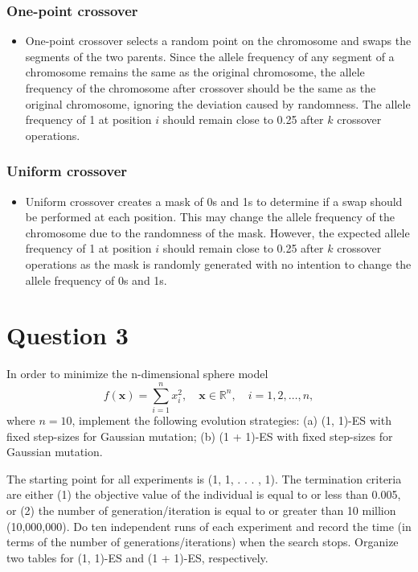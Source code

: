 \documentclass[12pt,letterpaper]{article}
\begin{document}
\subsubsection*{One-point crossover}
\begin{itemize}
    \item One-point crossover selects a random point on the chromosome and swaps the segments of the two parents. Since the allele frequency of any segment of a chromosome remains the same as the original chromosome, the allele frequency of the chromosome after crossover should be the same as the original chromosome, ignoring the deviation caused by randomness. The allele frequency of 1 at position $i$ should remain close to 0.25 after $k$ crossover operations.
\end{itemize}
\subsubsection*{Uniform crossover}
\begin{itemize}
    \item Uniform crossover creates a mask of 0s and 1s to determine if a swap should be performed at each position. This may change the allele frequency of the chromosome due to the randomness of the mask. However, the expected allele frequency of 1 at position $i$ should remain close to 0.25 after $k$ crossover operations as the mask is randomly generated with no intention to change the allele frequency of 0s and 1s.
\end{itemize}

\section*{Question 3}
In order to minimize the n-dimensional sphere model
\begin{equation}
    f(\mathbf{x}) = \sum_{i=1}^{n} x_i^2, \quad \mathbf{x} \in \mathbb{R}^n, \quad i = 1, 2, \ldots, n,
\end{equation}
where $n = 10$, implement the following evolution strategies:
(a) (1, 1)-ES with fixed step-sizes for Gaussian mutation;
(b) (1 + 1)-ES with fixed step-sizes for Gaussian mutation.

The starting point for all experiments is (1, 1, . . . , 1). The termination
criteria are either (1) the objective value of the individual is equal to
or less than 0.005, or (2) the number of generation/iteration is equal
to or greater than 10 million (10,000,000). Do ten independent runs
of each experiment and record the time (in terms of the number of
generations/iterations) when the search stops. Organize two tables for
(1, 1)-ES and (1 + 1)-ES, respectively.
\end{document}
